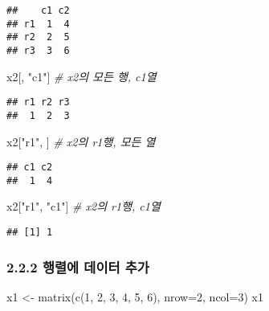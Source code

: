 \documentclass[
]{article}
\newenvironment{Shaded}{\begin{snugshade}}{\end{snugshade}}
\newcommand{\AttributeTok}[1]{\textcolor[rgb]{0.77,0.63,0.00}{#1}}
\newcommand{\CommentTok}[1]{\textcolor[rgb]{0.56,0.35,0.01}{\textit{#1}}}
\newcommand{\DecValTok}[1]{\textcolor[rgb]{0.00,0.00,0.81}{#1}}
\newcommand{\FunctionTok}[1]{\textcolor[rgb]{0.00,0.00,0.00}{#1}}
\newcommand{\NormalTok}[1]{#1}
\newcommand{\OtherTok}[1]{\textcolor[rgb]{0.56,0.35,0.01}{#1}}
\newcommand{\StringTok}[1]{\textcolor[rgb]{0.31,0.60,0.02}{#1}}
\begin{document}
\begin{verbatim}
##    c1 c2
## r1  1  4
## r2  2  5
## r3  3  6
\end{verbatim}

\begin{Shaded}
\begin{Highlighting}[]
\NormalTok{x2[, }\StringTok{"c1"}\NormalTok{]      }\CommentTok{\# x2의 모든 행, c1열}
\end{Highlighting}
\end{Shaded}

\begin{verbatim}
## r1 r2 r3 
##  1  2  3
\end{verbatim}

\begin{Shaded}
\begin{Highlighting}[]
\NormalTok{x2[}\StringTok{"r1"}\NormalTok{, ]      }\CommentTok{\# x2의 r1행, 모든 열}
\end{Highlighting}
\end{Shaded}

\begin{verbatim}
## c1 c2 
##  1  4
\end{verbatim}

\begin{Shaded}
\begin{Highlighting}[]
\NormalTok{x2[}\StringTok{"r1"}\NormalTok{, }\StringTok{"c1"}\NormalTok{]  }\CommentTok{\# x2의 r1행, c1열}
\end{Highlighting}
\end{Shaded}

\begin{verbatim}
## [1] 1
\end{verbatim}

\hypertarget{uxd589uxb82cuxc5d0-uxb370uxc774uxd130-uxcd94uxac00}{%
\subsubsection{2.2.2 행렬에 데이터
추가}\label{uxd589uxb82cuxc5d0-uxb370uxc774uxd130-uxcd94uxac00}}

\begin{Shaded}
\begin{Highlighting}[]
\NormalTok{x1 }\OtherTok{\textless{}{-}} \FunctionTok{matrix}\NormalTok{(}\FunctionTok{c}\NormalTok{(}\DecValTok{1}\NormalTok{, }\DecValTok{2}\NormalTok{, }\DecValTok{3}\NormalTok{, }\DecValTok{4}\NormalTok{, }\DecValTok{5}\NormalTok{, }\DecValTok{6}\NormalTok{), }\AttributeTok{nrow=}\DecValTok{2}\NormalTok{, }\AttributeTok{ncol=}\DecValTok{3}\NormalTok{)}
\NormalTok{x1}
\end{Highlighting}
\end{Shaded}
\end{document}
